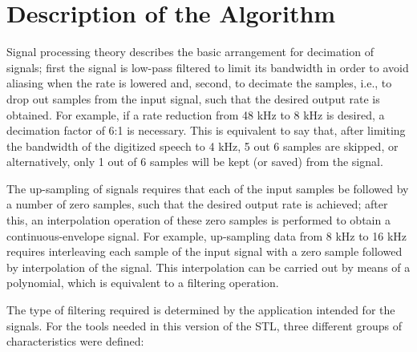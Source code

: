 \section{Description of the Algorithm}

Signal processing theory describes the basic arrangement for
decimation of signals; first the signal is low-pass filtered to
limit its bandwidth in order to avoid aliasing when the rate is
lowered and, second, to decimate the samples, i.e., to drop out
samples from the input signal, such that the desired output rate is
obtained. For example, if a rate reduction from 48 kHz to 8
kHz is desired, a decimation factor of 6:1 is necessary. This is
equivalent to say that, after limiting the bandwidth of the digitized
speech to 4 kHz, 5 out 6 samples are skipped, or alternatively, only 1
out of 6 samples will be kept (or saved) from the signal.

The up-sampling of signals requires that each of the input samples be
followed by a number of zero samples, such that the desired output
rate is achieved; after this, an interpolation operation of these zero
samples is performed to obtain a continuous-envelope signal. For
example, up-sampling data from 8 kHz to 16 kHz requires interleaving
each sample of the input signal with a zero sample followed by
interpolation of the signal. This interpolation can be carried out by
means of a polynomial, which is equivalent to a filtering operation.

The type of filtering required is determined by the application
intended for the signals. For the tools needed in this version of the
STL, three different groups of characteristics were defined:

